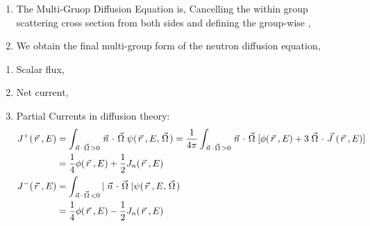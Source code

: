 \documentclass{school-22.211-notes}
\begin{document}
\begin{enumerate}
\begin{enumerate}
  \end{enumerate}

\item The Multi-Gruop Diffusion Equation is, 
Cancelling the within group scattering cross section from both sides and defining the group-wise , 

\item We obtain the final multi-group form of the neutron diffusion equation, 
\end{enumerate}


\clearpage
{}
\begin{enumerate}
\item Scalar flux, 
\item Net current,
\item Partial Currents in diffusion theory:
  \begin{align}
    J^+(\left.\vec{r}\right., E) &= \int_{\left.\vec{n}\right. \cdot \left.\vec{\Omega}\right. > 0} \left.\vec{n}\right. \cdot \left.\vec{\Omega}\right. \psi(\left.\vec{r}\right., E, \left.\vec{\Omega}\right.) = \frac{1}{4\pi} \int_{\left.\vec{n}\right. \cdot \left.\vec{\Omega}\right. > 0} \left.\vec{n}\right. \cdot \left.\vec{\Omega}\right. [\phi(\left.\vec{r}\right., E) + 3 \left.\vec{\Omega}\right. \cdot \left.\vec{J}\right.(\left.\vec{r}\right., E) ] \\
    &= \frac{1}{4} \phi(\left.\vec{r}\right., E) + \frac{1}{2} J_n (\left.\vec{r}\right., E) \\
    J^-(\left.\vec{r}\right., E) &= \int_{\left.\vec{n}\right. \cdot \left.\vec{\Omega}\right. < 0} |\left.\vec{n}\right. \cdot \left.\vec{\Omega}\right.| \psi(\left.\vec{r}\right., E, \left.\vec{\Omega}\right.)  \\
    &= \frac{1}{4} \phi(\left.\vec{r}\right., E) - \frac{1}{2} J_n (\left.\vec{r}\right., E) 
  \end{align}
\end{enumerate}
\end{document}
